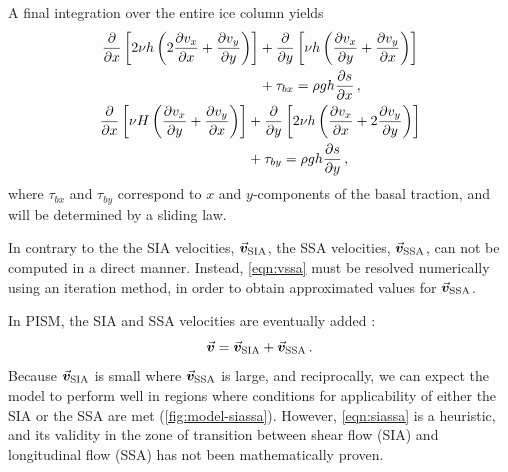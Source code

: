 \documentclass[a4paper]{kappa}
\newcommand{\vect}[1]{\va*{#1}} %
\newcommand{\vv}[0]{\vect{v}}           %
\newcommand{\vsia}[0]{\vv_{\mathrm{SIA}}}   %
\newcommand{\vssa}[0]{\vv_{\mathrm{SSA}}}   %
\begin{document}
A final integration over the entire ice column yields
\citep[Eqs.~7.7--7.8]{Weis.etal.1999}
\begin{subequations}
\label{eqn:vssa}
\begin{gather}
  \begin{split}
    \pdv{x} \left[2\relax{\nu}h
                  \left(2\pdv{v_x}{x} + \pdv{v_y}{y}\right) \right]
        &+ \pdv{y} \left[\relax{\nu}h
                         \left(\pdv{v_x}{y} + \pdv{v_y}{x}\right) \right] \\
        &+ \tau_{bx} = \rho gh \pdv{s}{x} \,,
  \end{split}\\
  \begin{split}
    \pdv{x} \left[\relax{\nu}H
                  \left(\pdv{v_x}{y} + \pdv{v_y}{x}\right) \right]
        &+ \pdv{y} \left[2\relax{\nu}h
                         \left(\pdv{v_x}{x} + 2\pdv{v_y}{y}\right) \right] \\
        &+ \tau_{by} = \rho gh \pdv{s}{y} \,,
  \end{split}
\end{gather}
\end{subequations}
where $\tau_{bx}$ and $\tau_{by}$ correspond to $x$ and $y$-components of the
basal traction, and will be determined by a sliding law.

In contrary to the the SIA velocities, $\vsia$, the SSA velocities, $\vssa$,
can not be computed in a direct manner. Instead, \cref{eqn:vssa} must be
resolved numerically using an iteration method, in order to obtain
approximated values for $\vssa$.

In PISM, the SIA and SSA velocities are eventually added
\citep[\cref{fig:model-siassa};][Eq.~15]{Winkelmann.etal.2011}:
\begin{equation}
    \label{eqn:siassa}
    \vv = \vsia + \vssa \,.
\end{equation}
Because $\vsia$ is small where $\vssa$ is large, and
reciprocally, we can expect the model to perform well in regions where
conditions for applicability of either the SIA or the SSA are met
(\cref{fig:model-siassa}). However,
\cref{eqn:siassa} is a heuristic, and its validity in the zone of
transition between shear flow (SIA) and longitudinal flow (SSA) has not been
mathematically proven.
\end{document}
